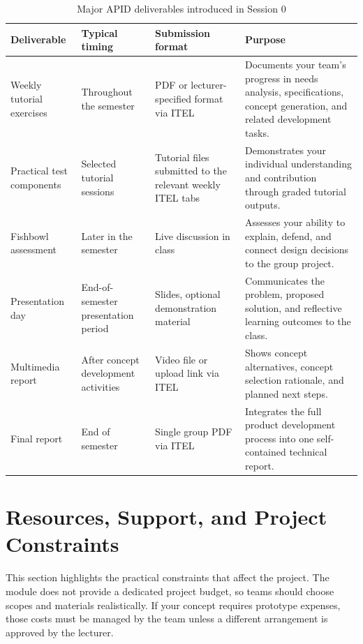 \begin{table}[htbp]
\centering
\caption{Major APID deliverables introduced in Session 0}
\label{tab:session0-deliverables}
\renewcommand{\arraystretch}{1.2}
\begin{tabularx}{\textwidth}{|>{\raggedright\arraybackslash}p{}|>{\raggedright\arraybackslash}p{}|>{\raggedright\arraybackslash}p{}|X|}
\hline
\textbf{Deliverable} & \textbf{Typical timing} & \textbf{Submission format} & \textbf{Purpose} \\
\hline
Weekly tutorial exercises & Throughout the semester & PDF or lecturer-specified format via ITEL & Documents your team's progress in needs analysis, specifications, concept generation, and related development tasks. \\
\hline
Practical test components & Selected tutorial sessions & Tutorial files submitted to the relevant weekly ITEL tabs & Demonstrates your individual understanding and contribution through graded tutorial outputs. \\
\hline
Fishbowl assessment & Later in the semester & Live discussion in class & Assesses your ability to explain, defend, and connect design decisions to the group project. \\
\hline
Presentation day & End-of-semester presentation period & Slides, optional demonstration material & Communicates the problem, proposed solution, and reflective learning outcomes to the class. \\
\hline
Multimedia report & After concept development activities & Video file or upload link via ITEL & Shows concept alternatives, concept selection rationale, and planned next steps. \\
\hline
Final report & End of semester & Single group PDF via ITEL & Integrates the full product development process into one self-contained technical report. \\
\hline
\end{tabularx}
\end{table}

\section{Resources, Support, and Project Constraints}

This section highlights the practical constraints that affect the project. The module does not provide a dedicated project budget, so teams should choose scopes and materials realistically. If your concept requires prototype expenses, those costs must be managed by the team unless a different arrangement is approved by the lecturer.

